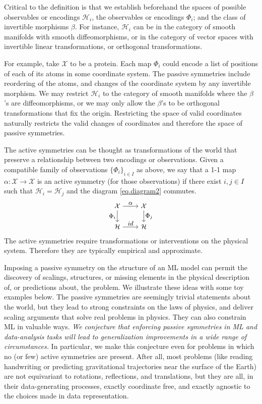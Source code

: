 \documentclass{article}
\theoremstyle{plain}
\theoremstyle{definition}
\theoremstyle{remark}
\begin{document}
Critical to the definition is that we establish beforehand the spaces of possible observables or encodings $\mathcal H_i$, the observables or encodings $\Phi_i$; and the class of invertible morphisms $\beta$. For instance, $\mathcal H_i$ can be in the category of smooth manifolds with smooth diffeomorphisms, or in the category of vector spaces with invertible linear transformations, or orthogonal transformations.   

For example, take $\mathcal X$ to be a protein. Each map $\Phi_i$ could encode a list of positions of each of its atoms in some coordinate system. The passive symmetries include reordering of the atoms, and changes of the coordinate system by any invertible morphism. We may restrict $\mathcal H_i$ to the category of smooth manifolds where the $\beta$'s are diffeomorphisms, or we may only allow the $\beta$'s to be orthogonal transformations that fix the origin. Restricting the space of valid coordinates naturally restricts the valid changes of coordinates and therefore the space of passive symmetries.

The active symmetries can be thought as transformations of the world that preserve a relationship between two encodings or observations.
Given a compatible family of observations $\{\Phi_i\}_{i\in I}$ as above, we say that a 1-1 map $\alpha:\mathcal X \to \mathcal X$ is an active symmetry (for those observations) if there exist $i,j\in I$ such that $\mathcal H_i = \mathcal H_j$ and the diagram \eqref{eq.diagram2} commutes. 
\begin{equation}\label{eq.diagram2}
\small
\begin{tikzcd}[every label/.append style = {font = \small}]
  {\cal X}\arrow[r,"\alpha"] \arrow[d,"\Phi_i",swap] & {\cal X}  \arrow[d,"\Phi_j"]\\
{\mathcal H} \arrow[r,"id"]  & {\mathcal H} 
\end{tikzcd}
\end{equation}
The active symmetries require transformations or interventions on the physical system. Therefore they are typically empirical and approximate.

Imposing a passive symmetry on the structure of an ML model can permit the discovery of scalings, structures, or missing elements in the physical description of, or predictions about, the problem.
We illustrate these ideas with some toy examples below.
The passive symmetries are seemingly trivial statements about the world, but they lead to strong constraints on the laws of physics, and deliver scaling arguments that solve real problems in physics.
They can also constrain ML in valuable ways.
\emph{We conjecture that enforcing passive symmetries in ML and data-analysis tasks will lead to generalization improvements in a wide range of circumstances.}
In particular, we make this conjecture even for problems in which no (or few) active symmetries are present.
After all, most problems (like reading handwriting or predicting gravitational trajectories near the surface of the Earth) are not equivariant to rotations, reflections, and translations, but they are all, in their data-generating processes, exactly coordinate free, and exactly agnostic to the choices made in data representation.
\end{document}
